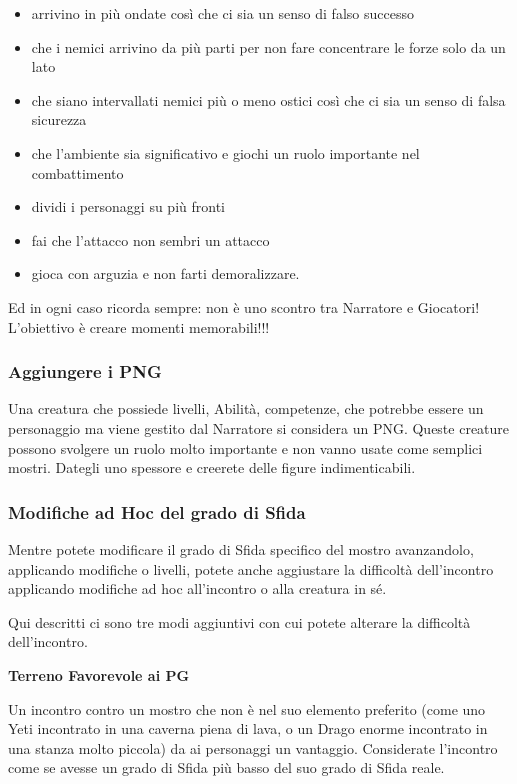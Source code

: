 \begin{multicols}{2}
\begin{itemize}[leftmargin=*]
\item arrivino in più ondate così che ci sia un senso di falso successo
\item che i nemici arrivino da più parti per non fare concentrare le forze solo da un lato
\item che siano intervallati nemici più o meno ostici così che ci sia un senso di falsa sicurezza
\item che l'ambiente sia significativo e giochi un ruolo importante nel combattimento
\item dividi i personaggi su più fronti
\item fai che l'attacco non sembri un attacco
\item gioca con arguzia e non farti demoralizzare.
\end{itemize}

Ed in ogni caso ricorda sempre: non è uno scontro tra Narratore e Giocatori! L'obiettivo è creare momenti memorabili!!!

\subsubsection{Aggiungere i PNG}

Una creatura che possiede livelli, Abilità, competenze, che potrebbe essere un personaggio ma viene gestito dal Narratore si considera un PNG. Queste creature possono svolgere un ruolo molto importante e non vanno usate come semplici mostri. Dategli uno spessore e creerete delle figure indimenticabili.

\subsubsection{Modifiche ad Hoc del grado di Sfida}

Mentre potete modificare il grado di Sfida specifico del mostro avanzandolo, applicando modifiche o livelli, potete anche aggiustare la difficoltà dell'incontro applicando modifiche ad hoc all'incontro o alla creatura in sé.

Qui descritti ci sono tre modi aggiuntivi con cui potete alterare la difficoltà dell'incontro.

\medskip

\textbf{Terreno Favorevole ai PG}

Un incontro contro un mostro che non è nel suo elemento preferito (come uno Yeti incontrato in una caverna piena di lava, o un Drago enorme incontrato in una stanza molto piccola) da ai personaggi un vantaggio. Considerate l'incontro come se avesse un grado di Sfida più basso del suo grado di Sfida reale.


\end{multicols}
